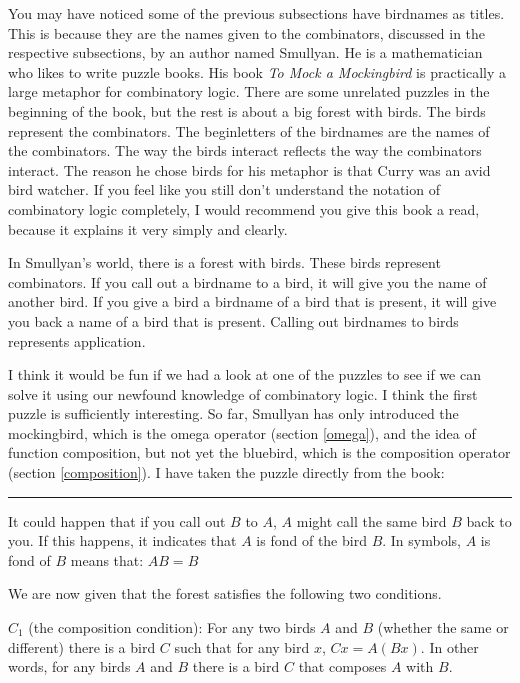 \documentclass[11pt]{article}
\begin{document}
You may have noticed some of the previous subsections have birdnames as titles.
This is because they are the names given to the combinators, discussed in the
respective subsections, by an author named Smullyan. He is a mathematician who
likes to write puzzle books. His book \emph{To Mock a Mockingbird}
\parencite{smullyan2000} is practically a large metaphor for combinatory logic.
There are some unrelated puzzles in the beginning of the book, but the rest is
about a big forest with birds. The birds represent the combinators. The
beginletters of the birdnames are the names of the combinators. The way the
birds interact reflects the way the combinators interact. The reason he chose
birds for his metaphor is that Curry was an avid bird watcher. If you feel like
you still don't understand the notation of combinatory logic completely, I
would recommend you give this book a read, because it explains it very simply
and clearly.

In Smullyan's world, there is a forest with birds. These birds represent
combinators. If you call out a birdname to a bird, it will give you the name of
another bird. If you give a bird a birdname of a bird that is present, it will
give you back a name of a bird that is present. Calling out birdnames to birds
represents application.

I think it would be fun if we had a look at one of the puzzles to see if we can
solve it using our newfound knowledge of combinatory logic. I think the first
puzzle is sufficiently interesting. So far, Smullyan has only introduced the
mockingbird, which is the omega operator (section \ref{omega}), and the idea of
function composition, but not yet the bluebird, which is the composition
operator (section \ref{composition}). I have taken the puzzle directly from the
book:

\setlength{\leftskip}{1cm}
\setlength{\rightskip}{1cm}
\begin{center}
\rule{15cm}{0.5pt}
\end{center}

It could happen that if you call out \(B\) to \(A\), \(A\) might call the same
bird \(B\) back to you. If this happens, it indicates that \(A\) is fond of the
bird \(B\). In symbols, \(A\) is fond of \(B\) means that: \(AB = B\)

We are now given that the forest satisfies the following two conditions. 

\(C_{1}\) (the composition condition): For any two birds \(A\) and \(B\)
(whether the same or different) there is a bird \(C\) such that for any bird
\(x\), \(Cx = A(Bx)\). In other words, for any birds \(A\) and \(B\) there is a
bird \(C\) that composes \(A\) with \(B\). 
\end{document}
